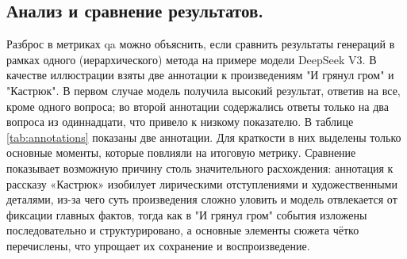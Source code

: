 \documentclass{article}
\theoremstyle{definition}
\theoremstyle{plain}
\begin{document}
\subsection*{Анализ и сравнение результатов.}
Разброс в метриках qa можно объяснить, если сравнить результаты генераций в рамках одного (иерархического) метода на примере модели DeepSeek V3.
В качестве иллюстрации взяты две аннотации к произведениям "И грянул гром" и "Кастрюк". В первом случае модель получила высокий результат, ответив на все, кроме одного вопроса; во второй 
аннотации содержались ответы только на два вопроса из одиннадцати, что привело к низкому показателю. В таблице \ref{tab:annotations} показаны две аннотации. 
Для краткости в них выделены только основные моменты, которые
повлияли на итоговую метрику. 
Сравнение показывает возможную причину столь значительного расхождения: аннотация к рассказу «Кастрюк» изобилует лирическими отступлениями и художественными деталями,
из-за чего суть произведения сложно уловить и модель отвлекается от фиксации главных фактов,
тогда как в "И грянул гром" события изложены последовательно и структурировано, 
а основные элементы сюжета чётко перечислены, что упрощает их сохранение и воспроизведение.
\end{document}
